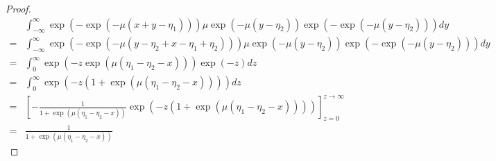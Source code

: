 \begin{proof}
    \begin{equation}
        \begin{aligned}
              & \int_{-\infty}^{\infty} \exp(-\exp(-\mu(x+y-\eta_1)))\mu \exp(-\mu (y-\eta_2)) \exp(-\exp(-\mu (y-\eta_2)))dy               \\
            = & \int_{-\infty}^{\infty} \exp(-\exp(-\mu(y-\eta_2+x-\eta_1+\eta_2)))\mu \exp(-\mu (y-\eta_2)) \exp(-\exp(-\mu (y-\eta_2)))dy \\
            = & \int_{0}^{\infty} \exp(-z\exp(\mu(\eta_1-\eta_2-x))) \exp(-z)dz                                                             \\
            = & \int_{0}^{\infty} \exp(-z(1+\exp(\mu(\eta_1-\eta_2-x))))dz                                                                  \\
            = & \left[-\frac{1}{1+\exp(\mu(\eta_1-\eta_2-x))} \exp(-z(1+\exp(\mu(\eta_1-\eta_2-x))))\right]_{z=0}^{z \to\infty}             \\
            = & \frac{1}{1+\exp(\mu(\eta_1-\eta_2-x))}
        \end{aligned}
    \end{equation}
\end{proof}